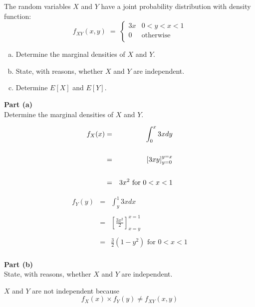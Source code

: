 \documentclass[a4paper,12pt]{article}
\begin{document}
	\large
	\noindent The random variables $X$ and $Y$ have a joint probability distribution with density
	function:
	\[  f_{XY} (x,y) \;=\; \begin{cases}
	3x & 0 < y  < x < 1 \\
	0 & \mbox{otherwise} \\
	\end{cases}\]
	
	\begin{enumerate}[(a)]
		\item Determine the marginal densities of $X$ and $Y$. 
		\item State, with reasons, whether $X$ and $Y$ are independent. 
		\item Determine $E[X]$ and $E[Y]$. 
	\end{enumerate}
	
	\newpage
	\begin{framed}
		\large 
		\noindent \textbf{Part (a)}\\
		Determine the marginal densities of $X$ and $Y$.
	\end{framed}
	
	\large
	
	\begin{eqnarray*}
		f_X(x) 
		&=& \int^{x}_{0} 3x dy \\
		& & \\
		&=&  {\displaystyle {\Large \left[ 3xy \right]^{y=x}_{y=0} } } \\
		& & \\
		&=& 3x^2 \mbox{ for }  0 < x < 1 \\
	\end{eqnarray*}
	
	\begin{eqnarray*}
		f_Y(y) 
		&=& \int^1_{y} 3x dx \\
		& & \\
		&=& \left[ \frac{3x^2}{2} \right]^{x=1}_{x=y}\\
		& & \\
		&=& \frac{3}{2} (1-y^2) \mbox{ for }  0 < x < 1 \\
	\end{eqnarray*}
	
	\newpage
	\begin{framed}
		\large 
		\noindent \textbf{Part (b)}\\
		State, with reasons, whether $X$ and $Y$ are independent.
	\end{framed}
	$X$ and $Y$ are not independent because
	\[f_X(x) \times f_Y(y)  \neq f_{XY} (x,y)\]
	
\end{document}
